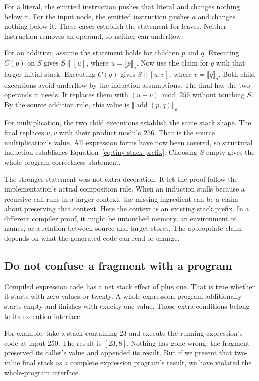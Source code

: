 For a literal, the emitted instruction pushes that literal and changes nothing below it.
For the input node, the emitted instruction pushes $a$ and changes nothing below it.
These cases establish the statement for leaves.
Neither instruction removes an operand, so neither can underflow.

For an addition, assume the statement holds for children $p$ and $q$.
Executing $C(p)$ on $S$ gives $S\mathbin{\|}[u]$, where $u=\llbracket p\rrbracket_a$.
Now use the claim for $q$ with that larger initial stack.
Executing $C(q)$ gives $S\mathbin{\|}[u,v]$, where $v=\llbracket q\rrbracket_a$.
Both child executions avoid underflow by the induction assumptions.
The final  has the two operands it needs.
It replaces them with $(u+v)\bmod256$ without touching $S$.
By the source addition rule, this value is $\llbracket\operatorname{add}(p,q)\rrbracket_a$.

For multiplication, the two child executions establish the same stack shape.
The final  replaces $u,v$ with their product modulo $256$.
That is the source multiplication's value.
All expression forms have now been covered, so structural induction establishes Equation~\ref{eq:tiny-stack-prefix}.
Choosing $S$ empty gives the whole-program correctness statement.

The stronger statement was not extra decoration.
It let the proof follow the implementation's actual composition rule.
When an induction stalls because a recursive call runs in a larger context, the missing ingredient can be a claim about preserving that context.
Here the context is an existing stack prefix.
In a different compiler proof, it might be untouched memory, an environment of names, or a relation between source and target stores.
The appropriate claim depends on what the generated code can read or change.

\subsection{Do not confuse a fragment with a program}
\label{sec:tiny-stack-fragments}

Compiled expression code has a net stack effect of plus one.
That is true whether it starts with zero values or twenty.
A whole expression program additionally starts empty and finishes with exactly one value.
Those extra conditions belong to its execution interface.

For example, take a stack containing $23$ and execute the running expression's code at input $250$.
The result is $[23,8]$.
Nothing has gone wrong: the fragment preserved its caller's value and appended its result.
But if we present that two-value final stack as a complete expression program's result, we have violated the whole-program interface.


